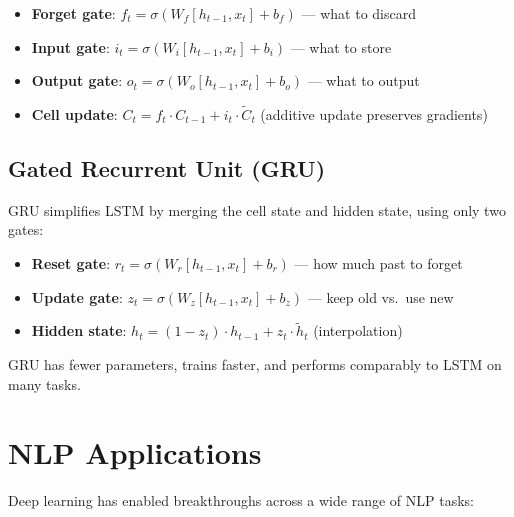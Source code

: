 \documentclass[11pt,a4paper]{article}
\begin{document}
\begin{itemize}[leftmargin=1.5em]
    \item \textbf{Forget gate}: $f_t = \sigma(W_f [h_{t-1}, x_t] + b_f)$ --- what to discard
    \item \textbf{Input gate}: $i_t = \sigma(W_i [h_{t-1}, x_t] + b_i)$ --- what to store
    \item \textbf{Output gate}: $o_t = \sigma(W_o [h_{t-1}, x_t] + b_o)$ --- what to output
    \item \textbf{Cell update}: $C_t = f_t \cdot C_{t-1} + i_t \cdot \tilde{C}_t$ (additive update preserves gradients)
\end{itemize}

\subsection{Gated Recurrent Unit (GRU)}

GRU simplifies LSTM by merging the cell state and hidden state, using only two gates:

\begin{itemize}[leftmargin=1.5em]
    \item \textbf{Reset gate}: $r_t = \sigma(W_r [h_{t-1}, x_t] + b_r)$ --- how much past to forget
    \item \textbf{Update gate}: $z_t = \sigma(W_z [h_{t-1}, x_t] + b_z)$ --- keep old vs.\ use new
    \item \textbf{Hidden state}: $h_t = (1 - z_t) \cdot h_{t-1} + z_t \cdot \tilde{h}_t$ (interpolation)
\end{itemize}

GRU has fewer parameters, trains faster, and performs comparably to LSTM on many tasks.

\section{NLP Applications}

Deep learning has enabled breakthroughs across a wide range of NLP tasks:
\end{document}
